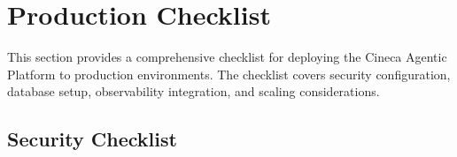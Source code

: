 
\section{Production Checklist}
\label{sec:production-checklist}

This section provides a comprehensive checklist for deploying the Cineca Agentic Platform to production environments. The checklist covers security configuration, database setup, observability integration, and scaling considerations.

\subsection{Security Checklist}

